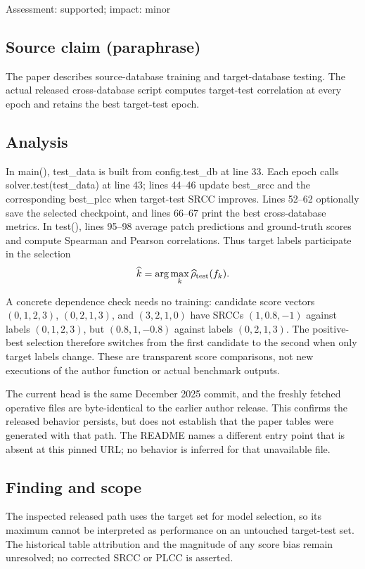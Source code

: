 \documentclass[11pt]{article}
\begin{document}
Assessment: supported; impact: minor

\subsection*{Source claim (paraphrase)}

The paper describes source-database training and target-database testing. The actual released cross-database script computes target-test correlation at every epoch and retains the best target-test epoch.

\subsection*{Analysis}

In main(), test\_data is built from config.test\_db at line 33. Each epoch calls solver.test(test\_data) at line 43; lines 44–46 update best\_srcc and the corresponding best\_plcc when target-test SRCC improves. Lines 52–62 optionally save the selected checkpoint, and lines 66–67 print the best cross-database metrics. In test(), lines 95–98 average patch predictions and ground-truth scores and compute Spearman and Pearson correlations. Thus target labels participate in the selection \[\widehat k=\arg\max_k\widehat\rho_{\rm test}(f_k).\]

A concrete dependence check needs no training: candidate score vectors \((0,1,2,3)\), \((0,2,1,3)\), and \((3,2,1,0)\) have SRCCs \((1,0.8,-1)\) against labels \((0,1,2,3)\), but \((0.8,1,-0.8)\) against labels \((0,2,1,3)\). The positive-best selection therefore switches from the first candidate to the second when only target labels change. These are transparent score comparisons, not new executions of the author function or actual benchmark outputs.

The current head is the same December 2025 commit, and the freshly fetched operative files are byte-identical to the earlier author release. This confirms the released behavior persists, but does not establish that the paper tables were generated with that path. The README names a different entry point that is absent at this pinned URL; no behavior is inferred for that unavailable file.

\subsection*{Finding and scope}

The inspected released path uses the target set for model selection, so its maximum cannot be interpreted as performance on an untouched target-test set. The historical table attribution and the magnitude of any score bias remain unresolved; no corrected SRCC or PLCC is asserted.
\end{document}
